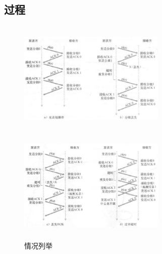 \documentclass[UTF8,14pt]{article}
\numberwithin{figure}{section}
\begin{document}
\subsection{过程}
\vspace{-0.5cm}
\begin{figure}[!htbp]
      \centering
      \begin{minipage}[!ht]{0.49\textwidth}
            \centering
            \includegraphics[width=7cm,height=5.5cm]{abp1_2.png}
      \end{minipage}
      \begin{minipage}[!ht]{0.49\textwidth}
            \centering
            \includegraphics[width=7cm,height=5.5cm]{abp1_3.png}
      \end{minipage}
      \caption{情况列举}
\end{figure}
\end{document}
